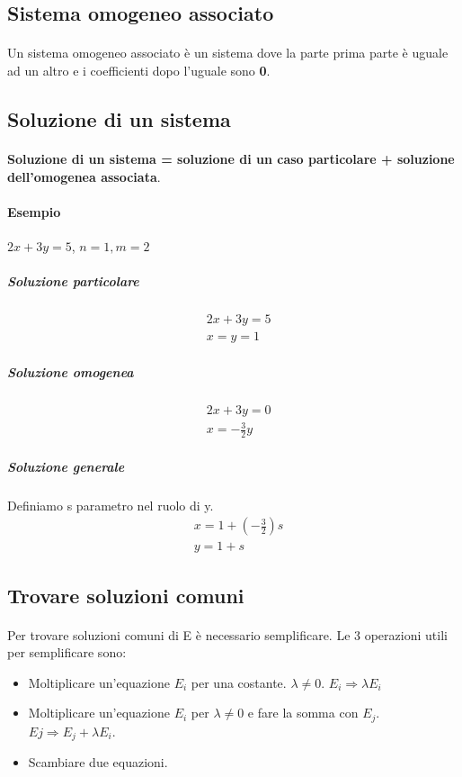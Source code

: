 \documentclass[a4paper, 12pt]{report}
\begin{document}
        \subsection{Sistema omogeneo associato}
            \paragraph{}Un sistema omogeneo associato è un sistema dove la parte prima parte è uguale
            ad un altro e i coefficienti dopo l'uguale sono \textbf{0}.
        \subsection{Soluzione di un sistema}
            \paragraph{}\textbf{Soluzione di un sistema = soluzione di un caso particolare + soluzione dell'omogenea associata}.
            \paragraph{Esempio} $2x+3y=5$, $n=1, m=2$
                \subparagraph{Soluzione particolare}
                    \begin{align*}
                        &2x+3y=5\\
                        &x=y=1
                    \end{align*}
                \subparagraph{Soluzione omogenea}
                    \begin{align*}
                        &2x+3y=0\\
                        &x=-\frac{3}{2}y
                    \end{align*}
                \subparagraph{Soluzione generale}Definiamo s parametro nel ruolo di y.
                    \begin{align*}
                        &x=1+(-\frac{3}{2})s\\
                        &y=1+s
                    \end{align*}
        \subsection{Trovare soluzioni comuni}
            \paragraph{}Per trovare soluzioni comuni di E è necessario semplificare.
            Le 3 operazioni utili per semplificare sono:
                    \begin{itemize}
                        \item Moltiplicare un'equazione $E_i$ per una costante. $\lambda \neq 0$. $E_i\Rightarrow\lambda E_i$ 
                        \item Moltiplicare un'equazione $E_i$ per $\lambda \neq 0$ e fare la somma con $E_j$.\\ $Ej\Rightarrow E_j+\lambda E_i$. 
                        \item Scambiare due equazioni.
                    \end{itemize}
    
\end{document}

